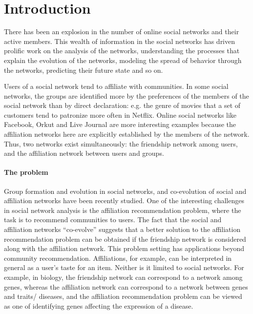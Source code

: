 \documentclass{sig-alternate}
\begin{document}

\section{Introduction}
\label{Introduction}
There has been an explosion in the number of online social networks and their active members. This wealth of information in the social networks has driven prolific work on the analysis of the networks, understanding the processes that explain the evolution of the networks, modeling the spread of behavior through the networks, predicting their future state and so on.

Users of a social network tend to affiliate with communities. In some social networks, the groups are identified more by the preferences of the members of the social network than by direct declaration: e.g. the genre of movies that a set of customers tend to patronize more often in Netflix. Online social networks like Facebook, Orkut and Live Journal are more interesting examples because the affiliation networks here are explicitly established by the members of the network. Thus, two networks exist simultaneously: the friendship network among users, and the affiliation network between users and groups.

\paragraph*{The problem}
Group formation and evolution in social networks\cite{GroupFormation}, and co-evolution of social and affiliation networks\cite{Coevolution} have been recently studied. One of the interesting challenges in social network analysis is the affiliation recommendation problem, where the task is to recommend communities to users. The fact that the social and affiliation networks ``co-evolve'' suggests that a better solution to the affiliation recommendation problem can be obtained if the friendship network is considered along with the affiliation network. This problem setting has applications beyond community recommendation. Affiliations, for example, can be interpreted in general as a user's taste for an item. Neither is it limited to social networks. For example, in biology, the friendship network can correspond to a network among genes, whereas the affiliation network can correspond to a network between genes and traits/ diseases, and the affiliation recommendation problem can be viewed as one of identifying genes affecting the expression of a disease.
\end{document}
